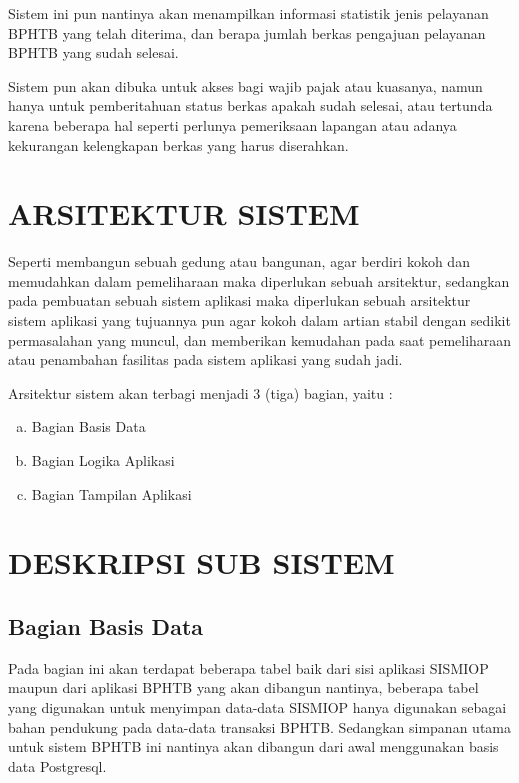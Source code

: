 \documentclass[pdftex,12pt, oneside]{article}
\begin{document}
Sistem ini pun nantinya akan menampilkan informasi statistik jenis pelayanan BPHTB yang telah diterima, dan berapa jumlah berkas pengajuan pelayanan BPHTB yang sudah selesai.

Sistem pun akan dibuka untuk akses bagi wajib pajak atau kuasanya, namun hanya untuk pemberitahuan status berkas apakah sudah selesai, atau tertunda karena beberapa hal seperti perlunya pemeriksaan lapangan atau adanya kekurangan kelengkapan berkas yang harus diserahkan.


\section{ARSITEKTUR SISTEM}

Seperti membangun sebuah gedung atau bangunan, agar berdiri kokoh dan memudahkan dalam pemeliharaan maka diperlukan sebuah arsitektur, sedangkan pada pembuatan sebuah sistem aplikasi maka diperlukan sebuah arsitektur sistem aplikasi yang tujuannya pun agar kokoh dalam artian stabil dengan sedikit permasalahan yang muncul, dan memberikan kemudahan pada saat pemeliharaan atau penambahan fasilitas pada sistem aplikasi yang sudah jadi.

Arsitektur sistem akan terbagi menjadi 3 (tiga) bagian, yaitu :

\begin{enumerate}[a.] 
\item Bagian Basis Data

\item Bagian Logika Aplikasi

\item Bagian Tampilan Aplikasi
\end{enumerate}

\section{DESKRIPSI SUB SISTEM}

\subsection{Bagian Basis Data}

Pada bagian ini akan terdapat beberapa tabel baik dari sisi aplikasi SISMIOP maupun dari aplikasi BPHTB yang akan dibangun nantinya, beberapa tabel yang digunakan untuk menyimpan data-data SISMIOP hanya digunakan sebagai bahan pendukung pada data-data transaksi BPHTB. Sedangkan simpanan utama untuk sistem BPHTB ini nantinya akan dibangun dari awal menggunakan basis data Postgresql.
\end{document}
